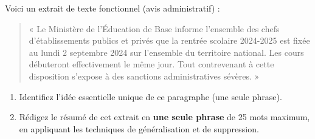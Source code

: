 \documentclass[11pt]{article}
\begin{document}
\begin{exercice}
Voici un extrait de texte fonctionnel (avis administratif) :
\begin{quote}
« Le Ministère de l'Éducation de Base informe l'ensemble des chefs d'établissements publics et privés que la rentrée scolaire 2024-2025 est fixée au lundi 2 septembre 2024 sur l'ensemble du territoire national. Les cours débuteront effectivement le même jour. Tout contrevenant à cette disposition s'expose à des sanctions administratives sévères. »
\end{quote}
\begin{enumerate}
    \item Identifiez l'idée essentielle unique de ce paragraphe (une seule phrase).
    \item Rédigez le résumé de cet extrait en \textbf{une seule phrase} de 25 mots maximum, en appliquant les techniques de généralisation et de suppression.
\end{enumerate}
\end{exercice}
\end{document}

